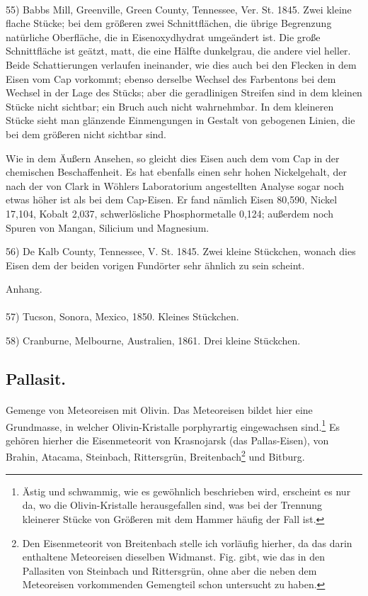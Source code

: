 \documentclass[a4paper, 11pt, oneside]{article}
\begin{document}
\paragraph{}
55) Babbs Mill, Greenville, Green County, Tennessee, Ver. St. 1845. Zwei kleine flache Stücke; bei dem größeren zwei Schnittflächen, die übrige Begrenzung natürliche Oberfläche, die in Eisenoxydhydrat umgeändert ist. Die große Schnittfläche ist geätzt, matt, die eine Hälfte dunkelgrau, die andere viel heller. Beide Schattierungen verlaufen ineinander, wie dies auch bei den Flecken in dem Eisen vom Cap vorkommt; ebenso derselbe Wechsel des Farbentons bei dem Wechsel in der Lage des Stücks; aber die geradlinigen Streifen sind in dem kleinen Stücke nicht sichtbar; ein Bruch auch nicht wahrnehmbar. In dem kleineren Stücke sieht man glänzende Einmengungen in Gestalt von gebogenen Linien, die bei dem größeren nicht sichtbar sind.

Wie in dem Äußern Ansehen, so gleicht dies Eisen auch dem vom Cap in der chemischen Beschaffenheit. Es hat ebenfalls einen sehr hohen Nickelgehalt, der nach der von Clark in Wöhlers Laboratorium angestellten Analyse sogar noch etwas höher ist als bei dem Cap-Eisen. Er fand nämlich Eisen 80,590, Nickel 17,104, Kobalt 2,037, schwerlösliche Phosphormetalle 0,124; außerdem noch Spuren von Mangan, Silicium und Magnesium.

56) De Kalb County, Tennessee, V. St. 1845. Zwei kleine Stückchen, wonach dies Eisen dem der beiden vorigen Fundörter sehr ähnlich zu sein scheint.
\begin{center}
Anhang. 
\end{center}
\paragraph{}
57) Tucson, Sonora, Mexico, 1850. Kleines Stückchen.

58) Cranburne, Melbourne, Australien, 1861. Drei kleine Stückchen.
\subsection{Pallasit.}
\paragraph{}
Gemenge von Meteoreisen mit Olivin. Das Meteoreisen bildet hier eine Grundmasse, in welcher Olivin-Kristalle porphyrartig eingewachsen sind.\footnote{Ästig und schwammig, wie es gewöhnlich beschrieben wird, erscheint es nur da, wo die Olivin-Kristalle herausgefallen sind, was bei der Trennung kleinerer Stücke von Größeren mit dem Hammer häufig der Fall ist.} Es gehören hierher die Eisenmeteorit von Krasnojarsk (das Pallas-Eisen), von Brahin, Atacama, Steinbach, Rittersgrün, Breitenbach\footnote{Den Eisenmeteorit von Breitenbach stelle ich vorläufig hierher, da das darin enthaltene Meteoreisen dieselben Widmanst. Fig. gibt, wie das in den Pallasiten von Steinbach und Rittersgrün, ohne aber die neben dem Meteoreisen vorkommenden Gemengteil schon untersucht zu haben.} und Bitburg.
\end{document}
